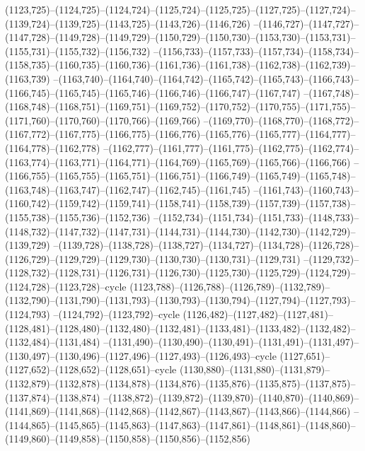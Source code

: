(1123,725)--(1124,725)--(1124,724)--(1125,724)--(1125,725)--(1127,725)--(1127,724)--(1139,724)--(1139,725)--(1143,725)--(1143,726)--(1146,726)
--(1146,727)--(1147,727)--(1147,728)--(1149,728)--(1149,729)--(1150,729)--(1150,730)--(1153,730)--(1153,731)--(1155,731)--(1155,732)--(1156,732)
--(1156,733)--(1157,733)--(1157,734)--(1158,734)--(1158,735)--(1160,735)--(1160,736)--(1161,736)--(1161,738)--(1162,738)--(1162,739)--(1163,739)
--(1163,740)--(1164,740)--(1164,742)--(1165,742)--(1165,743)--(1166,743)--(1166,745)--(1165,745)--(1165,746)--(1166,746)--(1166,747)--(1167,747)
--(1167,748)--(1168,748)--(1168,751)--(1169,751)--(1169,752)--(1170,752)--(1170,755)--(1171,755)--(1171,760)--(1170,760)--(1170,766)--(1169,766)
--(1169,770)--(1168,770)--(1168,772)--(1167,772)--(1167,775)--(1166,775)--(1166,776)--(1165,776)--(1165,777)--(1164,777)--(1164,778)--(1162,778)
--(1162,777)--(1161,777)--(1161,775)--(1162,775)--(1162,774)--(1163,774)--(1163,771)--(1164,771)--(1164,769)--(1165,769)--(1165,766)--(1166,766)
--(1166,755)--(1165,755)--(1165,751)--(1166,751)--(1166,749)--(1165,749)--(1165,748)--(1163,748)--(1163,747)--(1162,747)--(1162,745)--(1161,745)
--(1161,743)--(1160,743)--(1160,742)--(1159,742)--(1159,741)--(1158,741)--(1158,739)--(1157,739)--(1157,738)--(1155,738)--(1155,736)--(1152,736)
--(1152,734)--(1151,734)--(1151,733)--(1148,733)--(1148,732)--(1147,732)--(1147,731)--(1144,731)--(1144,730)--(1142,730)--(1142,729)--(1139,729)
--(1139,728)--(1138,728)--(1138,727)--(1134,727)--(1134,728)--(1126,728)--(1126,729)--(1129,729)--(1129,730)--(1130,730)--(1130,731)--(1129,731)
--(1129,732)--(1128,732)--(1128,731)--(1126,731)--(1126,730)--(1125,730)--(1125,729)--(1124,729)--(1124,728)--(1123,728)--cycle
(1123,788)--(1126,788)--(1126,789)--(1132,789)--(1132,790)--(1131,790)--(1131,793)--(1130,793)--(1130,794)--(1127,794)--(1127,793)--(1124,793)
--(1124,792)--(1123,792)--cycle
(1126,482)--(1127,482)--(1127,481)--(1128,481)--(1128,480)--(1132,480)--(1132,481)--(1133,481)--(1133,482)--(1132,482)--(1132,484)--(1131,484)
--(1131,490)--(1130,490)--(1130,491)--(1131,491)--(1131,497)--(1130,497)--(1130,496)--(1127,496)--(1127,493)--(1126,493)--cycle
(1127,651)--(1127,652)--(1128,652)--(1128,651)--cycle
(1130,880)--(1131,880)--(1131,879)--(1132,879)--(1132,878)--(1134,878)--(1134,876)--(1135,876)--(1135,875)--(1137,875)--(1137,874)--(1138,874)
--(1138,872)--(1139,872)--(1139,870)--(1140,870)--(1140,869)--(1141,869)--(1141,868)--(1142,868)--(1142,867)--(1143,867)--(1143,866)--(1144,866)
--(1144,865)--(1145,865)--(1145,863)--(1147,863)--(1147,861)--(1148,861)--(1148,860)--(1149,860)--(1149,858)--(1150,858)--(1150,856)--(1152,856)
